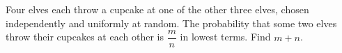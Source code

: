 Four elves each throw a cupcake at one of the other three elves, chosen independently and uniformly at random. The probability that some two elves throw their cupcakes at each other is $\dfrac {m}{n}$ in lowest terms. Find $m+n$.
